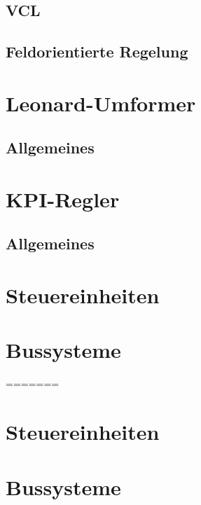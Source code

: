 \subsection{VCL}
\subsection{Feldorientierte Regelung}

\section{Leonard-Umformer}
\subsection{Allgemeines}
\subsection{ }

\section{KPI-Regler}
\subsection{Allgemeines}
\subsection{ }


\section{Steuereinheiten}
\section{Bussysteme}
=======
\section{Steuereinheiten}

\section{Bussysteme}